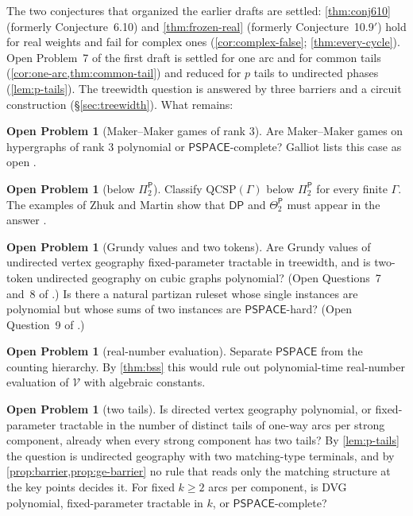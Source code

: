 \documentclass[11pt]{amsart}
\theoremstyle{plain}
\theoremstyle{definition}
\newtheorem{problem}[theorem]{Open Problem}
\theoremstyle{remark}
\numberwithin{equation}{section}
\newcommand{\val}{\mathcal{V}}            %
\newcommand{\cls}[1]{\mathsf{#1}}
\newcommand{\PSPACE}{\cls{PSPACE}}
\newcommand{\Pclass}{\cls{P}}
\begin{document}
The two conjectures that organized the earlier drafts are settled: \cref{thm:conj610} (formerly Conjecture~6.10) and \cref{thm:frozen-real} (formerly Conjecture~10.9$'$) hold for real weights and fail for complex ones (\cref{cor:complex-false}; \cref{thm:every-cycle}). Open Problem~7 of the first draft is settled for one arc and for common tails (\cref{cor:one-arc,thm:common-tail}) and reduced for $p$ tails to undirected phases (\cref{lem:p-tails}). The treewidth question is answered by three barriers and a circuit construction (\S\ref{sec:treewidth}). What remains:

\begin{problem}[Maker--Maker games of rank $3$]\label{prob:makermaker}
Are Maker--Maker games on hypergraphs of rank $3$ polynomial or $\PSPACE$-complete? Galliot lists this case as open \cite{Galliot25}.
\end{problem}

\begin{problem}[below $\Pi_2^{\Pclass}$]\label{prob:qcsp}
Classify $\mathrm{QCSP}(\Gamma)$ below $\Pi_2^{\Pclass}$ for every finite $\Gamma$. The examples of Zhuk and Martin show that $\mathsf{DP}$ and $\Theta_2^{\Pclass}$ must appear in the answer \cite{ZhukMartin}.
\end{problem}

\begin{problem}[Grundy values and two tokens]\label{prob:grundy}
Are Grundy values of undirected vertex geography fixed-parameter tractable in treewidth, and is two-token undirected geography on cubic graphs polynomial? (Open Questions~7 and~8 of \cite{BFT}.) Is there a natural partizan ruleset whose single instances are polynomial but whose sums of two instances are $\PSPACE$-hard? (Open Question~9 of \cite{BFT}.)
\end{problem}

\begin{problem}[real-number evaluation]\label{prob:ch}
Separate $\PSPACE$ from the counting hierarchy. By \cref{thm:bss} this would rule out polynomial-time real-number evaluation of $\val$ with algebraic constants.
\end{problem}

\begin{problem}[two tails]\label{prob:two-tails}
Is directed vertex geography polynomial, or fixed-parameter tractable in the number of distinct tails of one-way arcs per strong component, already when every strong component has two tails? By \cref{lem:p-tails} the question is undirected geography with two matching-type terminals, and by \cref{prop:barrier,prop:ge-barrier} no rule that reads only the matching structure at the key points decides it. For fixed $k\ge2$ arcs per component, is DVG polynomial, fixed-parameter tractable in $k$, or $\PSPACE$-complete?
\end{problem}
\end{document}

